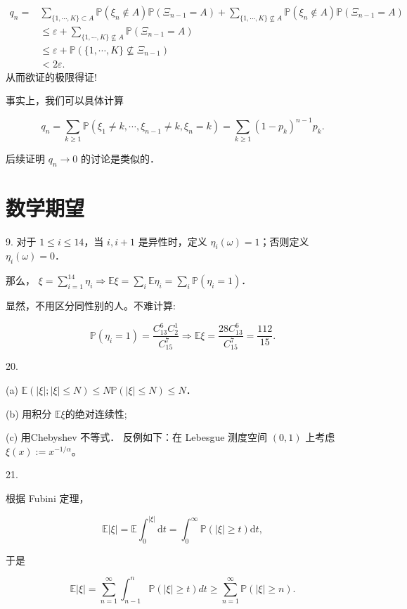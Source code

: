 \begin{align}
q_{n}= & \sum_{\{1, \cdots, K\} \subset A} \mathbb{P}(\xi_{n} \notin A) \mathbb{P}(\Xi_{n-1}=A) + \sum_{\{1, \cdots, K\} \nsubseteq A} \mathbb{P}(\xi_{n} \notin A) \mathbb{P}(\Xi_{n-1}=A) \\
& \leq \varepsilon+\sum_{\{1, \cdots, K\} \nsubseteq A} \mathbb{P}(\Xi_{n-1}=A) \\
& \leq \varepsilon+\mathbb{P}(\{1, \cdots, K\} \nsubseteq \Xi_{n-1}) \\
& <2 \varepsilon .
\end{align}
从而欲证的极限得证!

\begin{remark}
    事实上，我们可以具体计算

$$q_{n}=\sum_{k \geq 1} \mathbb{P}(\xi_{1} \neq k, \cdots, \xi_{n-1} \neq k, \xi_{n}=k)=\sum_{k \geq 1}\left(1-p_{k}\right)^{n-1} p_{k}.$$

后续证明  $q_{n} \rightarrow 0 $ 的讨论是类似的．
\end{remark}

\section{数学期望}
9. 
对于  $1 \leq i \leq 14  $，当  $i, i+1$ 是异性时，定义 $\eta_{i}(\omega)=1  $；否则定义  $\eta_{i}(\omega)=0  $．

那么， $\xi=\sum_{i=1}^{14} \eta_{i} \Rightarrow \mathbb{E} \xi=\sum_{i} \mathbb{E} \eta_{i}=\sum_{i} \mathbb{P}\left(\eta_{i}=1\right)  $．

显然，不用区分同性别的人。不难计算:

$$\mathbb{P}(\eta_{i}=1)=\frac{C_{13}^{6} C_{2}^{1}}{C_{15}^{7}} \Rightarrow \mathbb{E} \xi=\frac{28 C_{13}^{6}}{C_{15}^{7}}=\frac{112}{15}.$$

20.

(a) $\mathbb{E}(|\xi| ;|\xi| \leq N) \leq N \mathbb{P}(|\xi| \leq N) \leq N  $．

(b) 用积分  $\mathbb{E} \xi  $的绝对连续性;

(c) 用Chebyshev 不等式．
反例如下：在 Lebesgue 测度空间 $(0,1)$ 上考虑  $\xi(x):=x^{-1 / \alpha}$。

21.

根据 Fubini 定理，

$$\mathbb{E}|\xi|=\mathbb{E} \int_{0}^{|\xi|} \mathrm{d} t
=\int_{0}^{\infty} \mathbb{P}(|\xi| \geq t) \mathrm{d} t,$$

于是

$$\mathbb{E}|\xi|=\sum_{n=1}^{\infty} \int_{n-1}^{n} \mathbb{P}(|\xi| \geq t) d t \geq \sum_{n=1}^{\infty} \mathbb{P}(|\xi| \geq n).$$

